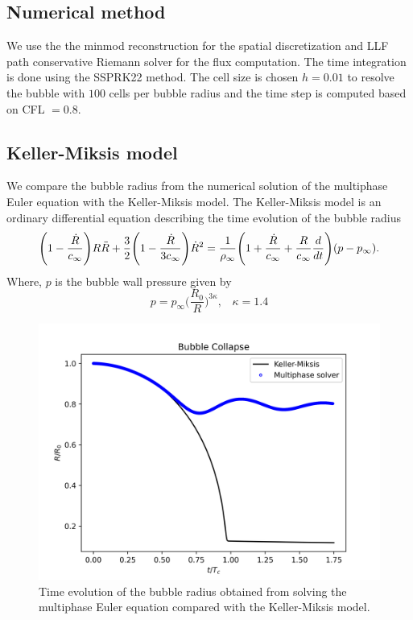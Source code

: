 \documentclass[a4paper]{article}
\begin{document}
\subsection*{Numerical method}
We use the the minmod reconstruction for the spatial discretization and LLF path conservative Riemann solver for the flux computation. The time integration is done using the SSPRK22 method. The cell size is chosen $h = 0.01$ to resolve the bubble with $100$ cells per bubble radius and the time step is computed based on CFL $= 0.8$.

\subsection*{Keller-Miksis model}
We compare the bubble radius from the numerical solution of the multiphase Euler equation with the Keller-Miksis model. The Keller-Miksis model is an ordinary differential equation describing the time evolution of the bubble radius
\begin{equation}
   \Bigg( 1 - \frac{\Dot{R}}{c_\infty} \Bigg)R \Ddot{R} + \frac{3}{2} \Bigg(1 - \frac{\Dot{R}}{3c_\infty} \Bigg)\Dot{R}^2 = \frac{1}{\rho_\infty} \Bigg( 1 + \frac{\Dot{R}}{c_\infty} + \frac{R}{c_\infty}\frac{d}{dt}\Bigg)(p - p_\infty).
\end{equation}
Where,  $p$ is the bubble wall pressure given by
\begin{equation}
    p = p_{\infty} \Bigg( \frac{R_0}{R} \Bigg)^{3 \kappa}, \;\;\; \kappa = 1.4 
\end{equation}
\begin{figure}[h!]
    \centering
    \includegraphics[scale=0.7]{images/kellermiksis.png}
    \caption{Time evolution of the bubble radius obtained from solving the multiphase Euler equation compared with the Keller-Miksis model.}
\end{figure}
\end{document}
